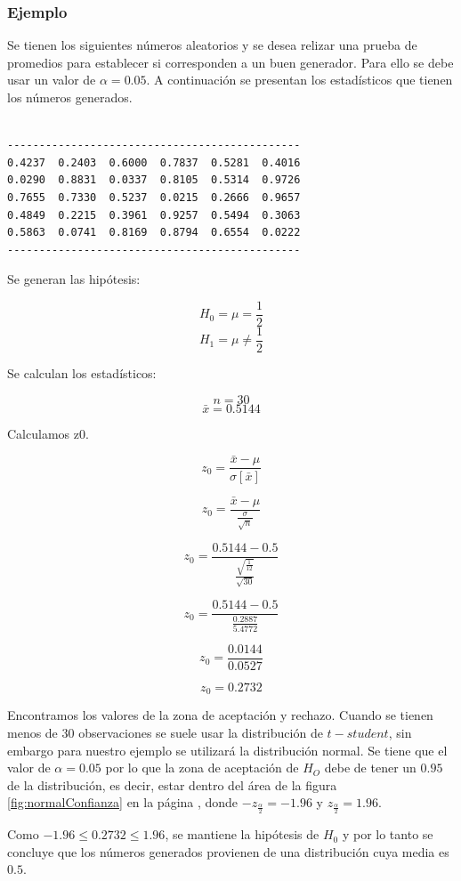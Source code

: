 \subsubsection{Ejemplo}
Se tienen los siguientes números aleatorios y se desea relizar una prueba de promedios para establecer si corresponden a un buen generador. Para ello se debe usar un valor de $\alpha =0.05$. A continuación se presentan los estadísticos que tienen los números generados.
\begin{verbatim}

----------------------------------------------
0.4237  0.2403  0.6000  0.7837  0.5281  0.4016
0.0290  0.8831  0.0337  0.8105  0.5314  0.9726
0.7655  0.7330  0.5237  0.0215  0.2666  0.9657
0.4849  0.2215  0.3961  0.9257  0.5494  0.3063
0.5863  0.0741  0.8169  0.8794  0.6554  0.0222
----------------------------------------------
\end{verbatim}

Se generan las hipótesis:

$$H_0 = \mu = \frac{1}{2}$$
$$H_1 = \mu \not = \frac{1}{2}$$



Se calculan los estadísticos:

$$n = 30$$
$$\bar{x} = 0.5144$$

Calculamos z0.

$$z_0 = \frac{\bar{x}-\mu}{\sigma[\bar{x}]}$$


$$z_0  = \frac{\bar{x} - \mu}{\frac{\sigma}{\sqrt{n}}}$$

$$z_0  = \frac{0.5144 - 0.5}{\frac{\sqrt{\frac{1}{12}}}{\sqrt{30}}}$$

$$z_0  = \frac{0.5144 - 0.5}{\frac{0.2887}{5.4772}}$$

$$z_0  = \frac{0.0144}{0.0527}$$

$$z_0  = 0.2732$$

Encontramos los valores de la zona de aceptación y rechazo. Cuando se tienen menos de 30 observaciones se suele usar la distribución de $t-student$, sin embargo para nuestro ejemplo se utilizará la distribución normal. Se tiene que el valor de $\alpha = 0.05$ por lo que la zona de aceptación de $H_O$ debe de tener un $0.95$ de la distribución, es decir, estar dentro del área de la figura \ref{fig:normalConfianza} en la página \pageref{fig:normalConfianza}, donde $-z_{\frac{\alpha}{2}} = -1.96$ y $z_{\frac{\alpha}{2}} = 1.96$.


Como $-1.96 \leq 0.2732 \leq 1.96$, se mantiene la hipótesis de $H_0$ y por lo tanto se concluye que los números generados provienen de una distribución cuya media es $0.5$.

